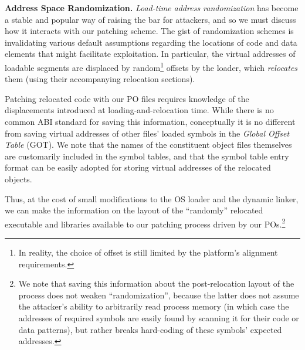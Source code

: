 {\bf Address Space Randomization.}
%
{\em Load-time address randomization} has become a stable and popular
way of raising the bar for attackers, and so we must discuss how it 
interacts with our patching scheme. 
%
The gist of randomization schemes is invalidating various default
assumptions regarding the locations of code and data elements that
might facilitate exploitation.
%
%
%
In particular, the virtual addresses of loadable segments
 are displaced by random\footnote{In reality, the choice of
   offset is still limited by the platform's alignment requirements.}
offsets by the loader, which {\em relocates} them (using their
accompanying relocation sections).

Patching %
relocated code with our PO files requires
knowledge of the displacements introduced at loading-and-relocation
time. While there is no common ABI standard for saving this
information, conceptually it is no different from saving virtual
addresses of other files' loaded symbols in the {\it Global Offset Table}
(GOT). We note that the names of the constituent object files themselves 
are customarily included in the symbol tables, and that the symbol
table entry format can be easily adopted for storing virtual addresses
of the %
relocated objects.

Thus, at the cost of small modifications to the OS loader and the 
dynamic linker, we can make the information on the layout of the
``randomly'' relocated executable and libraries available to
our patching process driven by our POs.\footnote{We note that saving 
this information 
%
about the post-relocation layout of the process 
does not weaken ``randomization'', because 
the latter does not assume the attacker's ability to arbitrarily read 
process memory (in which case the addresses of required symbols are
easily found by scanning it %
for their code or data patterns), 
but rather breaks hard-coding of these symbols' expected addresses.
} 

